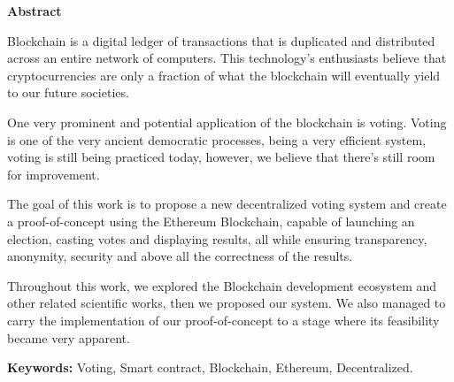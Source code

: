 \newpage

\thispagestyle{empty}

\vspace*{2cm}

\begin{center}
\textbf{Abstract}
\end{center}

Blockchain is a digital ledger of transactions that is duplicated and distributed across an entire network of computers. This technology's enthusiasts believe that cryptocurrencies are only a fraction of what the blockchain will eventually yield to our future societies.\medskip

One very prominent and potential application of the blockchain is voting. Voting is one of the very ancient democratic processes, being a very efficient system, voting is still being practiced today, however, we believe that there's still room for improvement.

The goal of this work is to propose a new decentralized voting system and create a proof-of-concept using the Ethereum Blockchain, capable of launching an election, casting votes and displaying results, all while ensuring transparency, anonymity, security and above all the correctness of the results.\medskip

Throughout this work, we explored the Blockchain development ecosystem and other related scientific works, then we proposed our system. We also managed to carry the implementation of our proof-of-concept to a stage where its feasibility became very apparent.\bigskip

\textbf{Keywords:} Voting, Smart contract, Blockchain, Ethereum, Decentralized.
